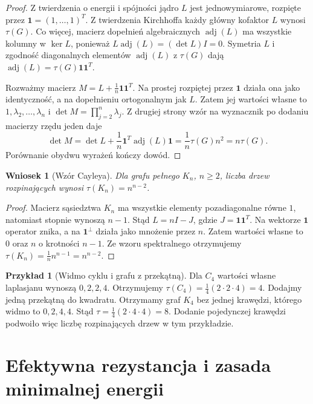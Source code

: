 \documentclass[11pt,a4paper]{report}
\numberwithin{equation}{section}
\theoremstyle{plain}
\newtheorem{wniosek}[twierdzenie]{Wniosek}
\theoremstyle{definition}
\newtheorem{przyklad}[twierdzenie]{Przykład}
\theoremstyle{remark}
\begin{document}
\begin{proof}
Z twierdzenia o energii i spójności jądro $L$ jest
jednowymiarowe, rozpięte przez $\mathbf1=(1,\ldots,1)^T$.
Z twierdzenia Kirchhoffa każdy główny kofaktor $L$
wynosi $\tau(G)$. Co więcej, macierz dopełnień
algebraicznych $\operatorname{adj}(L)$ ma wszystkie
kolumny w $\ker L$, ponieważ
$L\operatorname{adj}(L)=(\det L)I=0$.
Symetria $L$ i zgodność diagonalnych elementów
$\operatorname{adj}(L)$ z $\tau(G)$ dają
$\operatorname{adj}(L)=\tau(G)\mathbf1\mathbf1^T$.

Rozważmy macierz
$M=L+\tfrac1n\mathbf1\mathbf1^T$.
Na prostej rozpiętej przez $\mathbf1$ działa ona jako
identyczność, a na dopełnieniu ortogonalnym jak $L$.
Zatem jej wartości własne to $1,\lambda_2,\ldots,\lambda_n$
i $\det M=\prod_{j=2}^n\lambda_j$.
Z drugiej strony wzór na wyznacznik po dodaniu
macierzy rzędu jeden daje
\[
\det M=\det L+\frac1n\mathbf1^T\operatorname{adj}(L)\mathbf1
=\frac1n\tau(G)n^2=n\tau(G).
\]
Porównanie obydwu wyrażeń kończy dowód.
\end{proof}

\begin{wniosek}[Wzór Cayleya]
Dla grafu pełnego $K_n$, $n\ge2$, liczba drzew
rozpinających wynosi $\tau(K_n)=n^{n-2}$.
\end{wniosek}

\begin{proof}
Macierz sąsiedztwa $K_n$ ma wszystkie elementy
pozadiagonalne równe $1$, natomiast stopnie wynoszą
$n-1$. Stąd $L=nI-J$, gdzie $J=\mathbf1\mathbf1^T$.
Na wektorze $\mathbf1$ operator znika, a na
$\mathbf1^\perp$ działa jako mnożenie przez $n$.
Zatem wartości własne to $0$ oraz $n$ o krotności $n-1$.
Ze wzoru spektralnego otrzymujemy
$\tau(K_n)=\frac1n n^{n-1}=n^{n-2}$.
\end{proof}

\begin{przyklad}[Widmo cyklu i grafu z przekątną]
Dla $C_4$ wartości własne laplasjanu wynoszą
$0,2,2,4$. Otrzymujemy $\tau(C_4)=\frac14(2\cdot2\cdot4)=4$.
Dodajmy jedną przekątną do kwadratu. Otrzymamy graf
$K_4$ bez jednej krawędzi, którego widmo to $0,2,4,4$.
Stąd $\tau=\frac14(2\cdot4\cdot4)=8$.
Dodanie pojedynczej krawędzi podwoiło więc liczbę
rozpinających drzew w tym przykładzie.
\end{przyklad}

\section{Efektywna rezystancja i zasada minimalnej energii}
\label{sec:tg-resistance}
\end{document}
